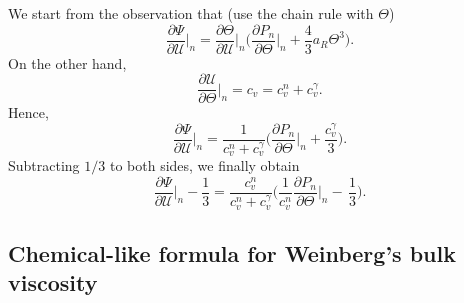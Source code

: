 \documentclass[a4paper, amsfonts, amssymb, amsmath, reprint, twocolumn, showkeys, nofootinbib]{revtex4-2}
\begin{document}
We start from the observation that (use the chain rule with $\Theta$)
\begin{equation}
\dfrac{\partial \Psi}{\partial \mathcal{U}} \bigg|_n = \dfrac{\partial \Theta}{\partial \mathcal{U}} \bigg|_n \bigg( \dfrac{\partial P_n}{\partial \Theta} \bigg|_n + \dfrac{4}{3} a_R \Theta^3    \bigg).
\end{equation}
On the other hand,
\begin{equation}
\dfrac{\partial \mathcal{U}}{\partial \Theta} \bigg|_n = c_v= c_v^n + c_v^\gamma.
\end{equation}
Hence,
\begin{equation}
\dfrac{\partial \Psi}{\partial \mathcal{U}} \bigg|_n =\dfrac{1}{c_v^n + c_v^\gamma} \bigg( \dfrac{\partial P_n}{\partial \Theta} \bigg|_n + \dfrac{c_v^\gamma}{3}   \bigg).
\end{equation}
Subtracting $1/3$ to both sides, we finally obtain
\begin{equation}\label{Lidentituz}
\dfrac{\partial \Psi}{\partial \mathcal{U}} \bigg|_n - \dfrac{1}{3} = \dfrac{c_v^n}{c_v^n + c_v^\gamma} \bigg( \dfrac{1}{c_v^n} \dfrac{\partial P_n}{\partial \Theta} \bigg|_n - \, \dfrac{1}{3} \bigg).
\end{equation}

\subsection{Chemical-like formula for Weinberg's bulk viscosity}\label{AppB22}
\end{document}
